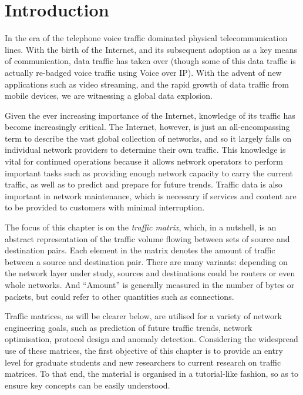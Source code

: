 \section{Introduction}
\label{sec:introduction}

In the era of the telephone voice traffic dominated physical
telecommunication lines. With the birth of the Internet, and its
subsequent adoption as a key means of communication, data traffic has
taken over (though some of this data traffic is actually re-badged
voice traffic using Voice over IP).  With the advent of new
applications such as video streaming, and the rapid growth of data
traffic from mobile devices, we are witnessing a global data
explosion.

Given the ever increasing importance of the Internet, knowledge of its
traffic has become increasingly critical.  The Internet, however, is
just an all-encompassing term to describe the vast global collection
of networks, and so it largely falls on individual network providers
to determine their own traffic.  This knowledge is vital for continued
operations because it allows network operators to perform important
tasks such as providing enough network capacity to carry the current
traffic, as well as to predict and prepare for future trends. Traffic
data is also important in network maintenance, which is necessary if
services and content are to be provided to customers with minimal
interruption.

The focus of this chapter is on the {\em traffic matrix}, which, in a
nutshell, is an abstract representation of the traffic volume flowing
between sets of source and destination pairs. Each element in the
matrix denotes the amount of traffic between a source and destination
pair.  There are many variants: depending on the network layer under
study, sources and destinations could be routers or even whole
networks. And ``Amount'' is generally measured in the number of bytes
or packets, but could refer to other quantities such as connections.

Traffic matrices, as will be clearer below, are utilised for a
variety of network engineering goals, such as prediction of future
traffic trends, network optimisation, protocol design and anomaly
detection.  Considering the widespread use of these matrices, the first
objective of this chapter is to provide an entry level for graduate
students and new researchers to current research on traffic
matrices. To that end, the material is organised in a tutorial-like
fashion, so as to ensure key concepts can be easily understood. 

